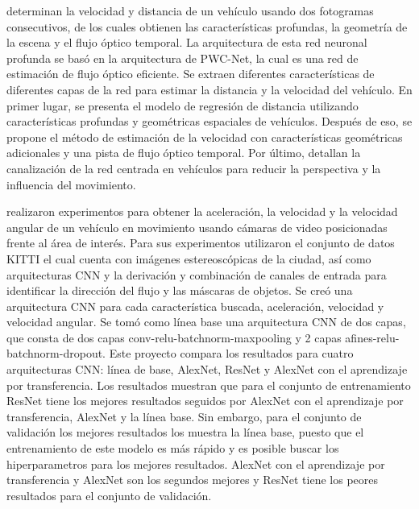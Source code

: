 \citeauthor{song2020Learning} determinan la velocidad y distancia de un vehículo usando dos fotogramas consecutivos, de los cuales obtienen las  características profundas, la geometría de la escena y el flujo óptico temporal. La arquitectura de esta red neuronal profunda se basó en la arquitectura de PWC-Net, la cual es una red de estimación de flujo óptico eficiente. Se extraen diferentes características de diferentes capas de la red para estimar la distancia y la velocidad del vehículo. En primer lugar, se presenta el modelo de regresión de distancia utilizando características profundas y geométricas espaciales de vehículos. Después de eso, se propone el método de estimación de la velocidad con características geométricas adicionales y una pista de flujo óptico temporal. Por último, detallan la canalización de la red centrada en vehículos para reducir la perspectiva y la influencia del movimiento.

\citeauthor{zhang2017Vehicle} realizaron experimentos para obtener la aceleración, la velocidad y la velocidad angular de un vehículo en movimiento usando cámaras de video posicionadas frente al área de interés. Para sus experimentos utilizaron el conjunto de datos KITTI el cual cuenta con imágenes estereoscópicas de la ciudad, así como arquitecturas CNN y la derivación y combinación de canales de entrada para identificar la dirección del flujo y las máscaras de objetos. Se creó una arquitectura CNN para cada característica buscada, aceleración, velocidad y velocidad angular. Se tomó como línea base una arquitectura CNN de dos capas, que consta de dos capas conv-relu-batchnorm-maxpooling y 2 capas afines-relu-batchnorm-dropout. Este proyecto compara los resultados para cuatro arquitecturas CNN: línea de base, AlexNet, ResNet y AlexNet con el aprendizaje por transferencia.  Los resultados muestran que para el conjunto de entrenamiento ResNet tiene los mejores resultados seguidos por AlexNet con el aprendizaje por transferencia, AlexNet y la línea base. Sin embargo, para el conjunto de validación  los mejores resultados los muestra la línea base, puesto que el entrenamiento de este modelo es más rápido y es posible buscar los hiperparametros para los mejores resultados. AlexNet con el aprendizaje por transferencia y AlexNet son los segundos mejores y ResNet tiene los peores resultados para el conjunto de validación.

